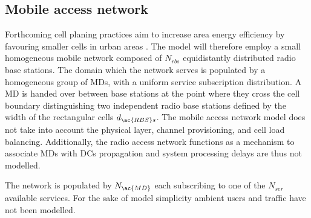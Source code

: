 \subsection{Mobile access network}
Forthcoming cell planing practices aim to increase area energy efficiency by favouring smaller cells in urban areas \cite{shahab2013framework,5360741}. The model will therefore employ a small homogeneous mobile network composed of $N_{rbs}$ equidistantly distributed radio base stations. The domain which the network serves is populated by a homogeneous group of \ac{MD}s, with a uniform service subscription distribution. A \ac{MD} is handed over between base stations at the point where they cross the cell boundary distinguishing two independent radio base stations defined by the width of the rectangular cells $d_{\ac{RBS}s}$. The mobile access network model does not take into account the physical layer, channel provisioning, and cell load balancing. Additionally, the radio access network functions as a mechanism to associate \ac{MD}s with \ac{DC}s propagation and system processing delays are thus not modelled.

The network is populated by $N_{\ac{MD}}$ each subscribing to one of the $N_{ser}$ available services. For the sake of model simplicity ambient users and traffic have not been modelled.